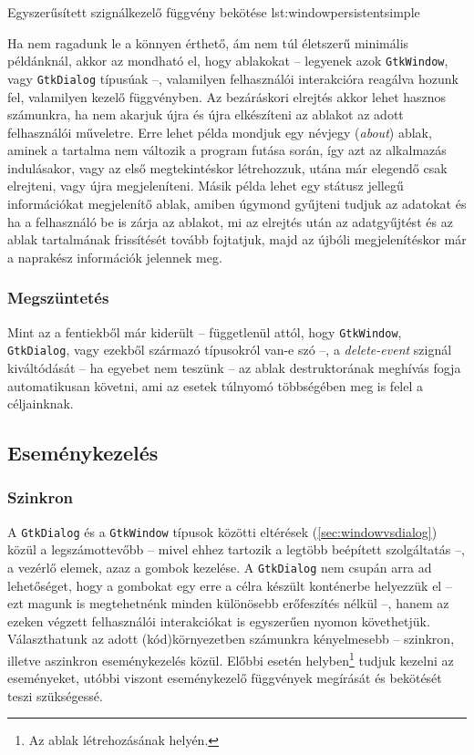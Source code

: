 {Egyszerűsített szignálkezelő függvény bekötése}
{lst:windowpersistentsimple}

Ha nem ragadunk le a könnyen érthető, ám nem túl életszerű minimális példánknál, akkor az mondható el, hogy ablakokat -- legyenek azok \texttt{GtkWindow}, vagy \texttt{GtkDialog} típusúak --, valamilyen felhasználói interakcióra reagálva hozunk fel, valamilyen kezelő függvényben. Az bezáráskori elrejtés akkor lehet hasznos számunkra, ha nem akarjuk újra és újra elkészíteni az ablakot az adott felhasználói műveletre. Erre lehet példa mondjuk egy névjegy (\textit{about}) ablak, aminek a tartalma nem változik a program futása során, így azt az alkalmazás indulásakor, vagy az első megtekintéskor létrehozzuk, utána már elegendő csak elrejteni, vagy újra megjeleníteni. Másik példa lehet egy státusz jellegű információkat megjelenítő ablak, amiben úgymond gyűjteni tudjuk az adatokat és ha a felhasználó be is zárja az ablakot, mi az elrejtés után az adatgyűjtést és az ablak tartalmának frissítését tovább fojtatjuk, majd az újbóli megjelenítéskor már a naprakész információk jelennek meg.

\subsubsection{Megszüntetés}

Mint az a fentiekből már kiderült -- függetlenül attól, hogy \texttt{GtkWindow}, \texttt{GtkDialog}, vagy ezekből származó típusokról van-e szó --, a \textit{delete-event} szignál kiváltódását -- ha egyebet nem teszünk -- az ablak destruktorának meghívás fogja automatikusan követni, ami az esetek túlnyomó többségében meg is felel a céljainknak.

\subsection{Eseménykezelés}
\label{sec:dialogresponse}

\subsubsection{Szinkron}

A \texttt{GtkDialog} és a \texttt{GtkWindow} típusok közötti eltérések (\ref{sec:windowvsdialog}) közül a legszámottevőbb -- mivel ehhez tartozik a legtöbb beépített szolgáltatás --, a vezérlő elemek, azaz a gombok kezelése. A \texttt{GtkDialog} nem csupán arra ad lehetőséget, hogy a gombokat egy erre a célra készült konténerbe helyezzük el -- ezt magunk is megtehetnénk minden különösebb erőfeszítés nélkül --, hanem az ezeken végzett felhasználói interakciókat is egyszerűen nyomon követhetjük. Választhatunk az adott (kód)környezetben számunkra kényelmesebb -- szinkron, illetve aszinkron eseménykezelés közül. Előbbi esetén helyben\footnote{Az ablak létrehozásának helyén.} tudjuk kezelni az eseményeket, utóbbi viszont eseménykezelő függvények megírását és bekötését teszi szükségessé.

